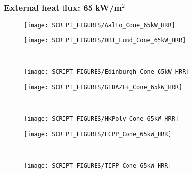 \subsubsection{External heat flux: 65 kW/m$^2$}
\begin{minipage}{0.5\textwidth}
\begin{figure}[H]
{\texttt{[image: SCRIPT\_FIGURES/Aalto\_Cone\_65kW\_HRR]}}\\
\end{figure}
\end{minipage}
\begin{minipage}{0.35\textwidth}
\begin{figure}[H]
{\texttt{[image: SCRIPT\_FIGURES/DBI\_Lund\_Cone\_65kW\_HRR]}}\\
\end{figure}
\end{minipage}\\
\begin{minipage}{0.5\textwidth}
\begin{figure}[H]
{\texttt{[image: SCRIPT\_FIGURES/Edinburgh\_Cone\_65kW\_HRR]}}\\
\end{figure}
\end{minipage}
\begin{minipage}{0.35\textwidth}
\begin{figure}[H]
{\texttt{[image: SCRIPT\_FIGURES/GIDAZE+\_Cone\_65kW\_HRR]}}\\
\end{figure}
\end{minipage}\\
\begin{minipage}{0.5\textwidth}
\begin{figure}[H]
{\texttt{[image: SCRIPT\_FIGURES/HKPoly\_Cone\_65kW\_HRR]}}\\
\end{figure}
\end{minipage}
\begin{minipage}{0.35\textwidth}
\begin{figure}[H]
{\texttt{[image: SCRIPT\_FIGURES/LCPP\_Cone\_65kW\_HRR]}}\\
\end{figure}
\end{minipage}\\
\newpage
\noindent
\begin{minipage}{0.5\textwidth}
\begin{figure}[H]
{\texttt{[image: SCRIPT\_FIGURES/TIFP\_Cone\_65kW\_HRR]}}\\
\end{figure}
\end{minipage}
